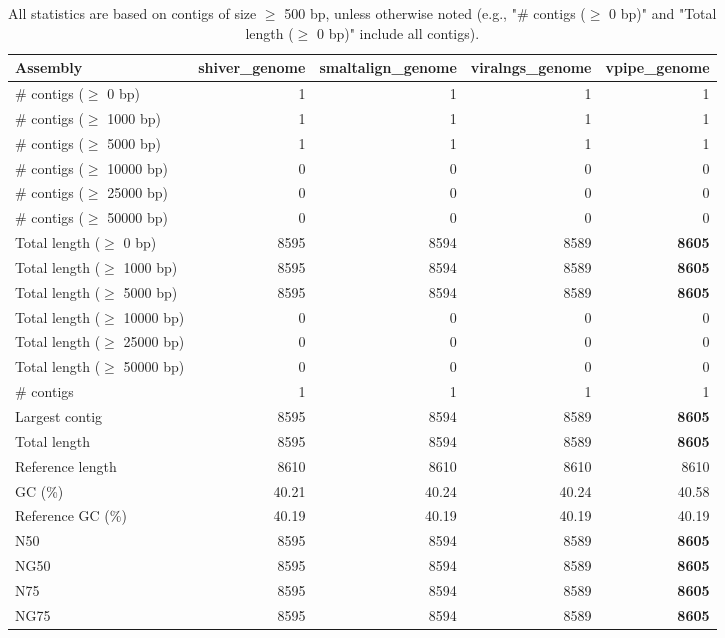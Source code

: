 \documentclass[12pt,a4paper]{article}
\begin{document}
\begin{table}[ht]
\begin{center}
\caption{All statistics are based on contigs of size $\geq$ 500 bp, unless otherwise noted (e.g., "\# contigs ($\geq$ 0 bp)" and "Total length ($\geq$ 0 bp)" include all contigs).}
\begin{tabular}{|l*{4}{|r}|}
\hline
Assembly & shiver\_genome & smaltalign\_genome & viralngs\_genome & vpipe\_genome \\ \hline
\# contigs ($\geq$ 0 bp) & 1 & 1 & 1 & 1 \\ \hline
\# contigs ($\geq$ 1000 bp) & 1 & 1 & 1 & 1 \\ \hline
\# contigs ($\geq$ 5000 bp) & 1 & 1 & 1 & 1 \\ \hline
\# contigs ($\geq$ 10000 bp) & 0 & 0 & 0 & 0 \\ \hline
\# contigs ($\geq$ 25000 bp) & 0 & 0 & 0 & 0 \\ \hline
\# contigs ($\geq$ 50000 bp) & 0 & 0 & 0 & 0 \\ \hline
Total length ($\geq$ 0 bp) & 8595 & 8594 & 8589 & {\bf 8605} \\ \hline
Total length ($\geq$ 1000 bp) & 8595 & 8594 & 8589 & {\bf 8605} \\ \hline
Total length ($\geq$ 5000 bp) & 8595 & 8594 & 8589 & {\bf 8605} \\ \hline
Total length ($\geq$ 10000 bp) & 0 & 0 & 0 & 0 \\ \hline
Total length ($\geq$ 25000 bp) & 0 & 0 & 0 & 0 \\ \hline
Total length ($\geq$ 50000 bp) & 0 & 0 & 0 & 0 \\ \hline
\# contigs & 1 & 1 & 1 & 1 \\ \hline
Largest contig & 8595 & 8594 & 8589 & {\bf 8605} \\ \hline
Total length & 8595 & 8594 & 8589 & {\bf 8605} \\ \hline
Reference length & 8610 & 8610 & 8610 & 8610 \\ \hline
GC (\%) & 40.21 & 40.24 & 40.24 & 40.58 \\ \hline
Reference GC (\%) & 40.19 & 40.19 & 40.19 & 40.19 \\ \hline
N50 & 8595 & 8594 & 8589 & {\bf 8605} \\ \hline
NG50 & 8595 & 8594 & 8589 & {\bf 8605} \\ \hline
N75 & 8595 & 8594 & 8589 & {\bf 8605} \\ \hline
NG75 & 8595 & 8594 & 8589 & {\bf 8605} \\ \hline

\end{tabular}
\end{center}
\end{table}
\end{document}
